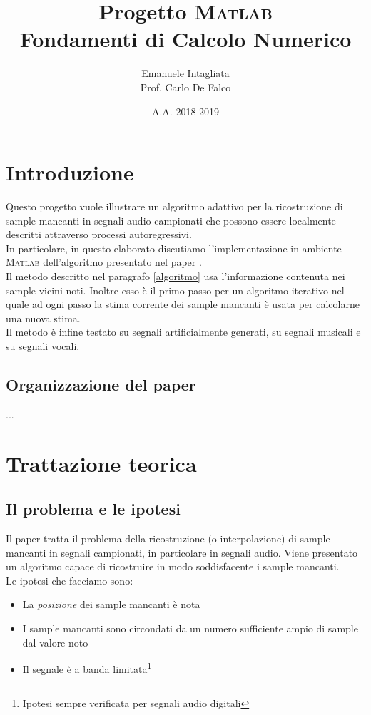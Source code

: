 \documentclass{article}
\title{Progetto \textsc{Matlab}\\Fondamenti di Calcolo Numerico}
\date{A.A. 2018-2019}
\author{Emanuele Intagliata\\Prof. Carlo De Falco}
\begin{document}
	\maketitle

	\newpage
	
	\tableofcontents

	\newpage
	\section{Introduzione}
Questo progetto vuole illustrare un algoritmo adattivo per la ricostruzione di sample mancanti in segnali audio campionati che possono essere localmente descritti attraverso processi autoregressivi.
\\
In particolare, in questo elaborato discutiamo l'implementazione in ambiente \textsc{Matlab} dell'algoritmo presentato nel paper \cite{paper_1986}.
\medskip
\\
Il metodo descritto nel paragrafo \ref{algoritmo} usa l'informazione contenuta nei sample vicini noti. Inoltre esso è il primo passo per un algoritmo iterativo nel quale ad ogni passo la stima corrente dei sample mancanti è usata per calcolarne una nuova stima. 
\\
Il metodo è infine testato su segnali artificialmente generati, su segnali musicali e su segnali vocali.

	\subsection{Organizzazione del paper}
	
	...

\newpage
	\section{Trattazione teorica}
	
	\subsection{Il problema e le ipotesi}
Il paper \cite{paper_1986} tratta il problema della ricostruzione (o interpolazione) di sample mancanti in segnali campionati, in particolare in segnali audio. Viene presentato un algoritmo capace di ricostruire in modo soddisfacente i sample mancanti.
\\
Le ipotesi che facciamo sono:

\begin{itemize}
\item La \emph{posizione} dei sample mancanti è nota
\item I sample mancanti sono circondati da un numero sufficiente ampio di sample dal valore noto
\item Il segnale è a banda limitata\footnote{Ipotesi sempre verificata per segnali audio digitali}
\end{itemize}
\end{document}
